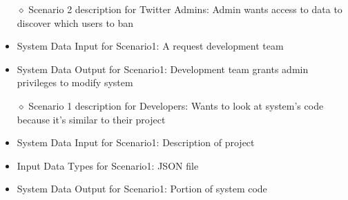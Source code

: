 \documentclass[10pt]{article}
\begin{document}
\begin{itemize}
	\begin{itemize} 
	\item[$\diamond$]{Scenario 2 description for Twitter Admins: }
	Admin wants access to data to discover which users to ban
	\item{System Data Input for Scenario1: }
	A request development team
	\item{System Data Output for Scenario1: }
	Development team grants admin privileges to modify system
	\end{itemize}

	\begin{itemize} 
	\item[$\diamond$]{Scenario 1 description for Developers: }
	Wants to look at system's code because it's similar to their project
	\item{System Data Input for Scenario1: }
	Description of project
	\item{Input Data Types for Scenario1: }
	JSON file
	\item{System Data Output for Scenario1: }
	Portion of system code
	\end{itemize}


\end{itemize}
\end{document}
